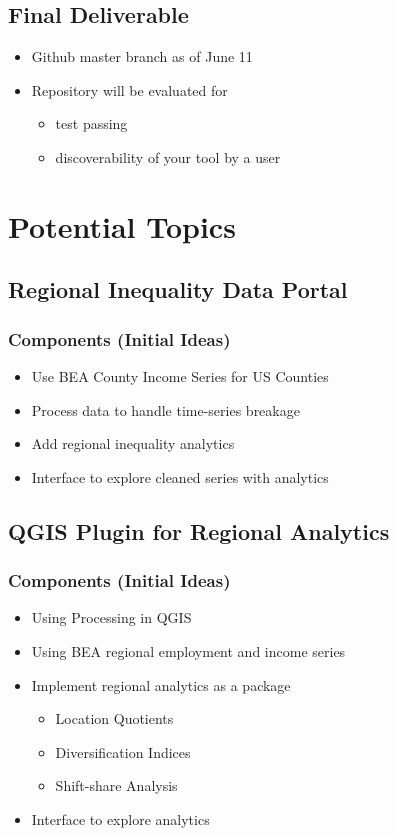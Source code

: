 \documentclass[12pt]{article}
\begin{document}
\subsection*{Final Deliverable}
\label{sec:orgf29a649}
\begin{itemize}
\item Github master branch as of June 11
\item Repository will be evaluated for 
\begin{itemize}
\item test passing
\item discoverability of your tool by a user
\end{itemize}
\end{itemize}

\section*{Potential Topics}
\label{sec:org629e22c}
\subsection*{Regional Inequality Data Portal}
\label{sec:org22a6d26}
\subsubsection*{Components (Initial Ideas)}
\label{sec:org91118e5}
\begin{itemize}
\item Use BEA County Income Series for US Counties
\item Process data to handle time-series breakage
\item Add regional inequality analytics
\item Interface to explore cleaned series with analytics
\end{itemize}
\subsection*{QGIS Plugin for Regional Analytics}
\label{sec:org4199eca}
\subsubsection*{Components (Initial Ideas)}
\label{sec:org302d2de}
\begin{itemize}
\item Using Processing in QGIS
\item Using BEA regional employment and income series
\item Implement regional analytics as a package
\begin{itemize}
\item Location Quotients
\item Diversification Indices
\item Shift-share Analysis
\end{itemize}
\item Interface to explore analytics
\end{itemize}
\end{document}
